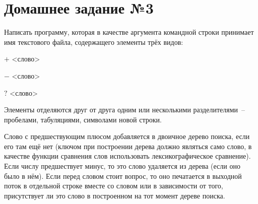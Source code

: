 \section*{Домашнее задание №3}


Написать программу, которая в качестве аргумента командной строки
принимает имя текстового файла, содержащего элементы трёх видов:
\begin{description}
\item{$+$} <слово>
\item{$-$} <слово>
\item{$?$} <слово>
\end{description}

Элементы отделяются друг от друга одним или несколькими
разделителями~-- пробелами, табуляциями, символами новой строки.

Слово
с предшествующим плюсом добавляется в двоичное дерево поиска, если
его там ещё нет (ключом при построении дерева должно являться само
слово, в качестве функции сравнения слов использовать
лексикографическое сравнение). Если числу предшествует минус, то это
слово удаляется из дерева (если оно было в нём). Если перед словом стоит
вопрос, то оно печатается в выходной поток в отдельной строке вместе со
словом  или  в зависимости от того, присутствует ли это слово в
построенном на тот момент дереве поиска.
